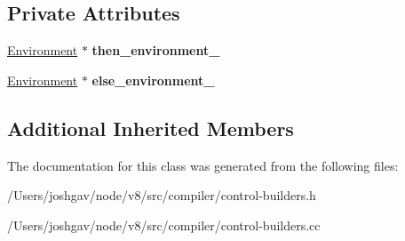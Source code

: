\subsection*{Private Attributes}
\begin{DoxyCompactItemize}
\item 
\hyperlink{classv8_1_1internal_1_1compiler_1_1_ast_graph_builder_1_1_environment}{Environment} $\ast$ {\bfseries then\+\_\+environment\+\_\+}\hypertarget{classv8_1_1internal_1_1compiler_1_1_if_builder_a7d2094f1f69f5737368914113462a47c}{}\label{classv8_1_1internal_1_1compiler_1_1_if_builder_a7d2094f1f69f5737368914113462a47c}

\item 
\hyperlink{classv8_1_1internal_1_1compiler_1_1_ast_graph_builder_1_1_environment}{Environment} $\ast$ {\bfseries else\+\_\+environment\+\_\+}\hypertarget{classv8_1_1internal_1_1compiler_1_1_if_builder_aa3c04860d4a8674485af1ad9d2532506}{}\label{classv8_1_1internal_1_1compiler_1_1_if_builder_aa3c04860d4a8674485af1ad9d2532506}

\end{DoxyCompactItemize}
\subsection*{Additional Inherited Members}


The documentation for this class was generated from the following files\+:\begin{DoxyCompactItemize}
\item 
/\+Users/joshgav/node/v8/src/compiler/control-\/builders.\+h\item 
/\+Users/joshgav/node/v8/src/compiler/control-\/builders.\+cc\end{DoxyCompactItemize}
